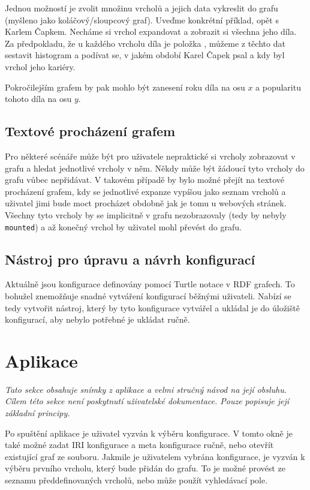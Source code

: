 Jednou možností je zvolit množinu vrcholů a jejich data vykreslit do grafu (myšleno jako koláčový/sloupcový graf). Uveďme konkrétní příklad, opět s Karlem Čapkem. Necháme si vrchol expandovat a zobrazit si všechna jeho díla. Za předpokladu, že u každého vrcholu díla je položka , můžeme z těchto dat sestavit histogram a podívat se, v jakém období Karel Čapek psal a kdy byl vrchol jeho kariéry.

Pokročilejším grafem by pak mohlo být zanesení roku díla na osu $x$ a popularitu tohoto díla na osu $y$.

\subsection*{Textové procházení grafem}
Pro některé scénáře může být pro uživatele nepraktické si vrcholy zobrazovat v grafu a hledat jednotlivé vrcholy v něm. Někdy může být žádoucí tyto vrcholy do grafu vůbec nepřidávat. V takovém případě by bylo možné přejít na textové procházení grafem, kdy se jednotlivé expanze vypíšou jako seznam vrcholů a uživatel jimi bude moct procházet obdobně jak je tomu u webových stránek. Všechny tyto vrcholy by se implicitně v grafu nezobrazovaly (tedy by nebyly \texttt{mounted}) a až konečný vrchol by uživatel mohl převést do grafu.

\subsection*{Nástroj pro úpravu a návrh konfigurací}
Aktuálně jsou konfigurace definovány pomocí Turtle notace v RDF grafech. To bohužel znemožňuje snadné vytváření konfigurací běžnými uživateli. Nabízí se tedy vytvořit nástroj, který by tyto konfigurace vytvářel a ukládal je do úložiště konfigurací, aby nebylo potřebné je ukládat ručně.

\section{Aplikace}
\textit{Tato sekce obsahuje snímky z aplikace a velmi stručný návod na její obsluhu. Cílem této sekce není poskytnutí uživatelské dokumentace. Pouze popisuje její základní principy.}

Po spuštění aplikace je uživatel vyzván k výběru konfigurace. V tomto okně je také možné zadat IRI konfigurace a meta konfigurace ručně, nebo otevřít existující graf ze souboru. Jakmile je uživatelem vybrána konfigurace, je vyzván k výběru prvního vrcholu, který bude přidán do grafu. To je možné provést ze seznamu předdefinovaných vrcholů, nebo může použít vyhledávací pole.

